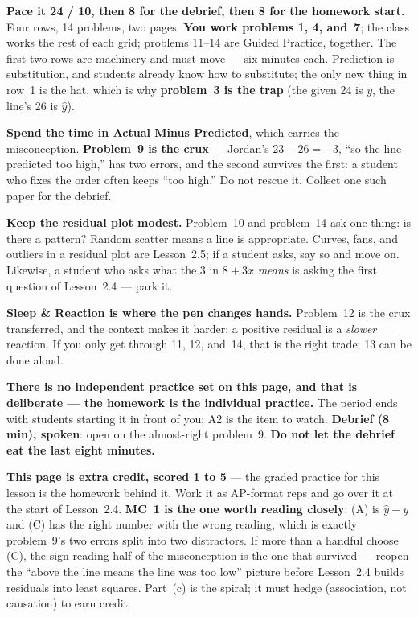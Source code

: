\documentclass[10pt]{article}
\begin{document}
\begin{teachernote}
\textbf{Pace it 24 / 10, then 8 for the debrief, then 8 for the homework start.} Four rows, 14
problems, two pages. \textbf{You work problems 1, 4, and~7}; the class works the rest of each
grid; problems 11--14 are Guided Practice, together. The first two rows are machinery and must
move --- six minutes each. Prediction is substitution, and students already know how to
substitute; the only new thing in row~1 is the hat, which is why \textbf{problem~3 is the trap}
(the given 24 is $y$, the line's 26 is $\hat{y}$).

\textbf{Spend the time in Actual Minus Predicted}, which carries the misconception.
\textbf{Problem~9 is the crux} --- Jordan's $23 - 26 = -3$, ``so the line predicted too high,''
has two errors, and the second survives the first: a student who fixes the order often keeps
``too high.'' Do not rescue it. Collect one such paper for the debrief.

\textbf{Keep the residual plot modest.} Problem~10 and problem~14 ask one thing: is there a
pattern? Random scatter means a line is appropriate. Curves, fans, and outliers in a residual
plot are Lesson~2.5; if a student asks, say so and move on. Likewise, a student who asks what
the 3 in $8 + 3x$ \emph{means} is asking the first question of Lesson~2.4 --- park it.

\textbf{Sleep \& Reaction is where the pen changes hands.} Problem~12 is the crux transferred,
and the context makes it harder: a positive residual is a \emph{slower} reaction. If you only
get through 11, 12, and~14, that is the right trade; 13 can be done aloud.

\textbf{There is no independent practice set on this page, and that is deliberate --- the
homework is the individual practice.} The period ends with students starting it in front of
you; A2 is the item to watch. \textbf{Debrief (8 min), spoken}: open on the almost-right
problem~9. \textbf{Do not let the debrief eat the last eight minutes.}
\end{teachernote}

\begin{teachernote}[AP Practice]
\textbf{This page is extra credit, scored 1 to 5} --- the graded practice for this lesson is
the homework behind it. Work it as AP-format reps and go over it at the start of Lesson~2.4.
\textbf{MC~1 is the one worth reading closely}: (A) is $\hat{y} - y$ and (C) has the right
number with the wrong reading, which is exactly problem~9's two errors split into two
distractors. If more than a handful choose (C), the sign-reading half of the misconception is
the one that survived --- reopen the ``above the line means the line was too low'' picture
before Lesson~2.4 builds residuals into least squares. Part~(c) is the spiral; it must hedge
(association, not causation) to earn credit.
\end{teachernote}
\end{document}
